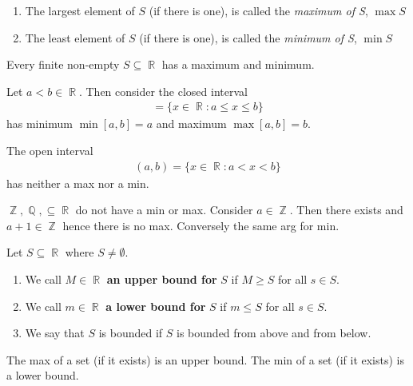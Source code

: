 \documentclass[a4paper, 11pt]{article}
\DeclareMathOperator{\R}{\mathbb{R}}
\DeclareMathOperator{\Q}{\mathbb{Q}}
\DeclareMathOperator*{\Z}{\mathbb{Z}}
\begin{document}
\begin{enumerate}
  \item The largest element of $S$ (if there is one), is called the \textit{maximum of S}, $\max S$
  \item The least element of $S$ (if there is one), is called the \textit{minimum of S}, $\min S$
\end{enumerate}

\begin{example}
Every finite non-empty $S \subseteq \R$ has a maximum and minimum.
\end{example}

\begin{example}
Let $a < b \in \R$. Then consider the closed interval
\begin{align*}
  [a, b] = \lbrace x \in \R: a \leq x \leq b \rbrace
\end{align*}
has minimum $\min [a, b] = a$ and maximum $\max [a, b] = b$.
\end{example}

\begin{example}
The open interval
\begin{align*}
  (a, b) = \lbrace x \in \R: a < x < b \rbrace
\end{align*}
has neither a max nor a min.
\end{example}

\begin{example}
$\Z, \Q, \subseteq \R$ do not have a min or max. Consider $a \in \Z$. Then there exists and $a + 1 \in \Z$ hence there is no max.
Conversely the same arg for min.
\end{example}

\begin{definition}[Bounds]
Let $S \subseteq \R$ where $S \neq \emptyset$.
\begin{enumerate}
  \item We call $M \in \R$ \textbf{an upper bound for} $S$ if $M \geq S$ for all $s \in S$.
  \item We call $m \in \R$ \textbf{a lower bound for} $S$ if $m \leq S$ for all $s \in S$.
  \item We say that $S$ is bounded if $S$ is bounded from above and from below.
\end{enumerate}
\end{definition}

\begin{example}
The max of a set (if it exists) is an upper bound. The min of a set (if it exists) is a lower bound.
\end{example}
\end{document}
